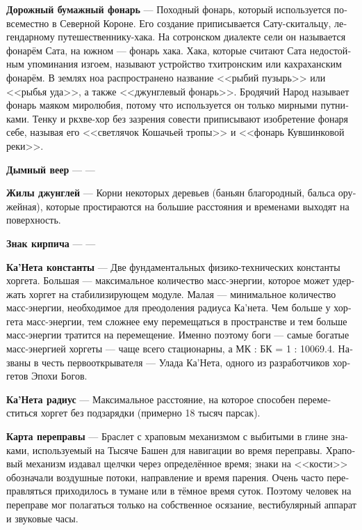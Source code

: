 \documentclass[a4paper,12pt,fleqn]{book}\usepackage{cooltooltips}\usepackage{polyglossia}\setdefaultlanguage[babelshorthands=true]{russian}\setotherlanguage{english}\defaultfontfeatures{Ligatures=TeX,Mapping=tex-text} \usepackage{xcolor}\definecolor{lightgray}{HTML}{bbbbbb}\color{lightgray}\newcommand{\ml}[3]{\textenglish{\textcolor{black}{#3}}}
\newcommand{\theterm}[3]{\textbf{\hypertarget{#1}{#2}} --- #3}
\begin{document}
{\theterm{stray-lantern}
{Дорожный бумажный фонарь}
{Походный фонарь, который используется повсеместно в Северной Короне.
Его создание приписывается Сату-скитальцу, легендарному путешественнику-хака.
На сотронском диалекте сели он называется фонарём Сата, на южном --- фонарь хака.
Хака, которые считают Сата недостойным упоминания изгоем, называют устройство тхитронским или кахраханским фонарём.
В землях ноа распространено название <<рыбий пузырь>> или <<рыбья уда>>, а также <<джунглевый фонарь>>.
Бродячий Народ называет фонарь маяком миролюбия, потому что используется он только мирными путниками.
Тенку и ркхве-хор без зазрения совести приписывают изобретение фонаря себе, называя его <<светлячок Кошачьей тропы>> и <<фонарь Кувшинковой реки>>.}

\theterm{fume-fan}
{Дымный веер}
{---}

\theterm{silva-veins}
{Жилы джунглей}
{Корни некоторых деревьев (баньян благородный, бальса оружейная), которые простираются на большие расстояния и временами выходят на поверхность.}

\theterm{brick-sign}
{Знак кирпича}
{---}

\theterm{canet-constantae} %
{Ка'Нета константы}
{Две фундаментальных физико-технических константы хоргета.
Большая --- максимальное количество масс-энергии, которое может удержать хоргет на стабилизирующем модуле. Малая --- минимальное количество масс-энергии, необходимое для преодоления радиуса Ка'нета.
Чем больше у хоргета масс-энергии, тем сложнее ему перемещаться в пространстве и тем больше масс-энергии тратится на перемещение.
Именно поэтому боги --- самые богатые масс-энергией хоргеты --- чаще всего стационарны, а МК : БК = 1 : 10069.4.
Названы в честь первооткрывателя --- Улада Ка'Нета, одного из разработчиков хоргетов Эпохи Богов.}

\theterm{canet-radius} %
{Ка'Нета радиус}
{Максимальное расстояние, на которое способен переместиться хоргет без подзарядки (примерно 18 тысяч парсак).}

\theterm{c-map}
{Карта переправы}
{Браслет с храповым механизмом с выбитыми в глине знаками, используемый на Тысяче Башен для навигации во время переправы.
Храповый механизм издавал щелчки через определённое время;
знаки на <<кости>> обозначали воздушные потоки, направление и время парения.
Очень часто переправляться приходилось в тумане или в тёмное время суток.
Поэтому человек на переправе мог полагаться только на собственное осязание, вестибулярный аппарат и звуковые часы.}

}
\end{document}
